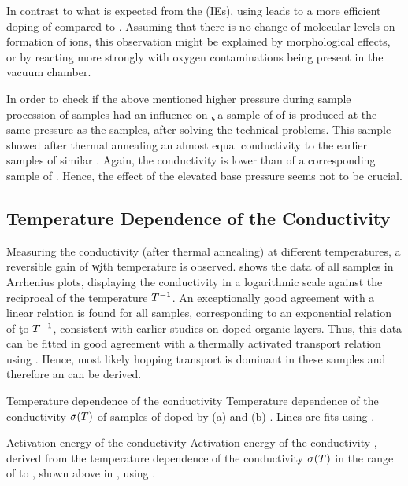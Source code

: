 In contrast to what is expected from the \IEs (IEs), using \CrPd leads to a more efficient doping of \CS compared to \WPd.
Assuming that there is no change of molecular levels on formation of ions, this observation might be explained by morphological effects, or by \WPd reacting more strongly with oxygen contaminations being present in the vacuum chamber.

In order to check if the above mentioned higher pressure during sample procession of \WPd samples had an influence on \c, a sample of \C[0.033] of \WPd is produced at the same pressure as the \CrPd samples, after solving the technical problems. This sample showed after thermal annealing an almost equal conductivity to the earlier \WPd samples of similar \CLong. Again, the conductivity is lower than of a corresponding sample of \CrPd. Hence, the effect of the elevated base pressure seems not to be crucial.

\subsection{Temperature Dependence of the Conductivity}%
\label{sec:ResPdCondEact}
%
Measuring the conductivity (after thermal annealing) at different temperatures, a reversible gain of \c with temperature is observed.  shows the data of all samples in Arrhenius plots, displaying the conductivity in a logarithmic scale against the reciprocal of the temperature $\T^{-1}$. An exceptionally good agreement with a linear relation is found for all samples, corresponding to an exponential relation of \c to $\T^{-1}$, consistent with earlier studies on doped organic layers\cite{Fujimori1994,Pfeiffer1998}. Thus, this data can be fitted in good agreement with a thermally activated transport relation using . Hence, most likely hopping transport is dominant in these samples and therefore an \EactLong \Eact can be derived.

%
{Temperature dependence of the conductivity}%
{Temperature dependence of the conductivity $\c(T)$ of samples of \CS doped by (a) \CrPd and (b) \WPd. Lines are fits using .}%

%
{Activation energy of the conductivity}%
{Activation energy of the conductivity \Eact, derived from the temperature dependence of the conductivity $\c(T)$ in the range of \T[30] to , shown above in , using .
}%

